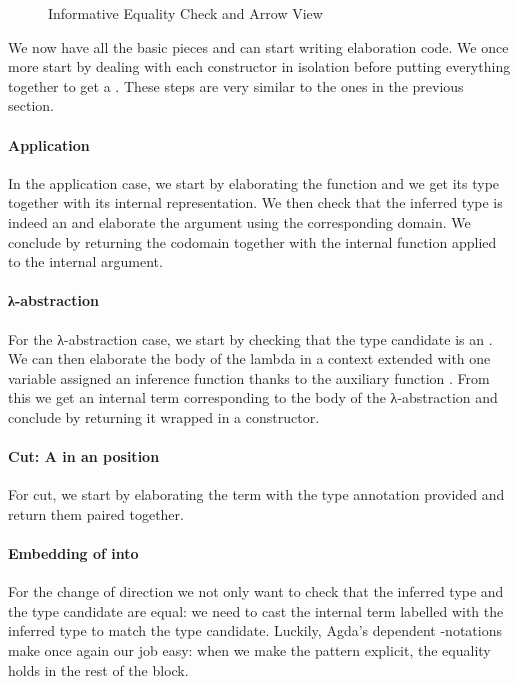 \begin{figure}[h]
\begin{minipage}{0.45\textwidth}
\end{minipage}
\begin{minipage}{0.45\textwidth}
\end{minipage}
\caption{Informative Equality Check and Arrow View\label{fig:informativecheck}}
\end{figure}

We now have all the basic pieces and can start writing elaboration code. We
once more start by dealing with each constructor in isolation before putting
everything together to get a . These steps are very similar to
the ones in the previous section.

\paragraph{Application} In the application case, we start by elaborating the
function and we get its type together with its internal representation. We then
check that the inferred type is indeed an  and elaborate the argument
using the corresponding domain. We conclude by returning the codomain together
with the internal function applied to the internal argument.
\paragraph{λ-abstraction} For the λ-abstraction case, we start by checking that
the type candidate is an . We can then elaborate the body of the lambda
in a context extended with one  variable assigned an inference function
thanks to the auxiliary function . From this we get an internal term
corresponding to the body of the λ-abstraction and conclude by returning it wrapped
in a  constructor.
\paragraph{Cut: A  in an  position} For cut, we start by
elaborating the term with the type annotation provided and return them paired
together.
\paragraph{Embedding of  into } For the change of direction
 we not only want to check that the inferred type and the type candidate
are equal: we need to cast the internal term labelled with the inferred type to
match the type candidate. Luckily, Agda's dependent -notations make once
again our job easy: when we make the pattern  explicit, the equality holds
in the rest of the block.

